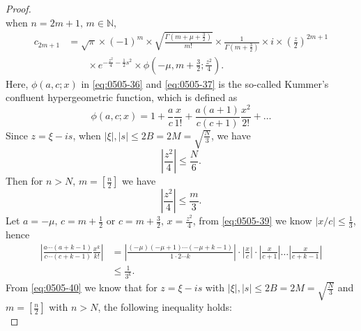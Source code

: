 \documentclass[10pt,a4paper]{amsart}
\begin{document}
\begin{proof}
\begin{equation}
  \end{equation}
  when $n = 2m+1,\, m \in \mathbb{N}$,
  \begin{equation}\label{eq:0505-37}
    \begin{aligned}
    c_{2 m+1} & =\sqrt{\pi} \times(-1)^m \times \sqrt{\frac{\Gamma\left(m+\mu+\frac{3}{2}\right)}{m!}} \times \frac{1}{\Gamma\left(m+\frac{3}{2}\right)} \times i \times\left(\frac{z}{2}\right)^{2 m+1} \\
    &{}\qquad \times e^{-\frac{z^2}{4}-\frac{1}{2} s^2} \times \phi\left(-\mu, m+\frac{3}{2} ; \frac{z^2}{4}\right).
    \end{aligned}
  \end{equation}
  Here, $\phi\left(a,c;x\right)$ in \eqref{eq:0505-36} and \eqref{eq:0505-37} is the so-called
  Kummer's confluent hypergeometric function, which is defined as
  \begin{equation}\label{eq:0505-38}
    \phi(a, c ; x)=1+\frac{a}{c} \frac{x}{1!}+\frac{a(a+1)}{c(c+1)} \frac{x^2}{2!}+\ldots
  \end{equation}
  Since $z = \xi - is$, when $|\xi|,|s| \leqslant 2 B=2 M=\sqrt{\frac{N}{3}}$, we have
  \begin{displaymath}
    \left|\frac{z^2}{4}\right| \leqslant \frac{N}{6}.
  \end{displaymath}
  Then for $n > N,\, m=\left[\frac{n}{2}\right]$ we have
  \begin{equation}\label{eq:0505-39}
    \left|\frac{z^2}{4}\right| \leqslant \frac{m}{3}.
  \end{equation}
  Let $a = -\mu,\,c = m+\frac{1}{2}$ or $c = m+\frac{3}{2},\,x=\frac{z^2}{4}$,
  from \eqref{eq:0505-39} we know $|x / c| \leqslant \frac{1}{3}$, hence
  \begin{equation}\label{eq:0505-40}
    \begin{aligned}
    \left|\frac{a \cdots(a+k-1)}{c \cdots(c+k-1)} \frac{x^k}{k!}\right| 
    & =  \left|\frac{(-\mu) (-\mu+1) \cdots (-\mu+k-1)}{1 \cdot 2  \cdots  k}\right| \cdot\left|\frac{x}{c}\right| \cdot\left|\frac{x}{c+1}\right|  \ldots \left|\frac{x}{c+k-1}\right| \\
    & \leqslant  \frac{1}{3^k}.
    \end{aligned}
  \end{equation}
  From \eqref{eq:0505-40} we know that for $z=\xi-i s$ with $|\xi|,|s| \leqslant 2 B=2 M=\sqrt{\frac{N}{3}}$
  and $m=\left[\frac{n}{2}\right]$ with $n>N$, the following inequality holds:
  \begin{equation}\label{eq:0505-41}

\end{equation}
\end{proof}
\end{document}
